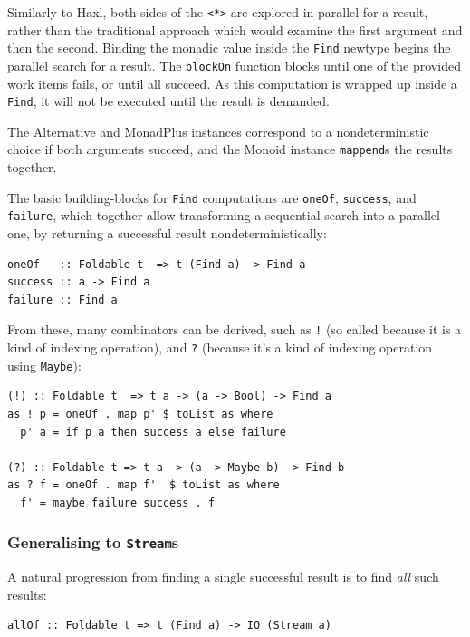 Similarly to Haxl\cite{haxl}, both sides of the \verb|<*>| are
explored in parallel for a result, rather than the traditional
approach which would examine the first argument and then the
second. Binding the monadic value inside the \verb|Find| newtype
begins the parallel search for a result. The \verb|blockOn| function
blocks until one of the provided work items fails, or until all
succeed. As this computation is wrapped up inside a \verb|Find|, it
will not be executed until the result is demanded.

The Alternative and MonadPlus instances correspond to a
nondeterministic choice if both arguments succeed, and the Monoid
instance \verb|mappend|s the results together.

The basic building-blocks for \verb|Find| computations are
\verb|oneOf|, \verb|success|, and \verb|failure|, which together allow
transforming a sequential search into a parallel one, by returning a
successful result nondeterministically:

\begin{verbatim}
oneOf   :: Foldable t  => t (Find a) -> Find a
success :: a -> Find a
failure :: Find a
\end{verbatim}

From these, many combinators can be derived, such as \verb|!| (so
called because it is a kind of indexing operation), and \verb|?|
(because it's a kind of indexing operation using \verb|Maybe|):

\vfill
\begin{verbatim}
(!) :: Foldable t  => t a -> (a -> Bool) -> Find a
as ! p = oneOf . map p' $ toList as where
  p' a = if p a then success a else failure

(?) :: Foldable t => t a -> (a -> Maybe b) -> Find b
as ? f = oneOf . map f'  $ toList as where
  f' = maybe failure success . f
\end{verbatim}

\subsubsection{Generalising to \texttt{Stream}s}
\label{sec:prelims-searchparty-api-stream}

A natural progression from finding a single successful result is to
find \textit{all} such results:

\begin{verbatim}
allOf :: Foldable t => t (Find a) -> IO (Stream a)
\end{verbatim}


